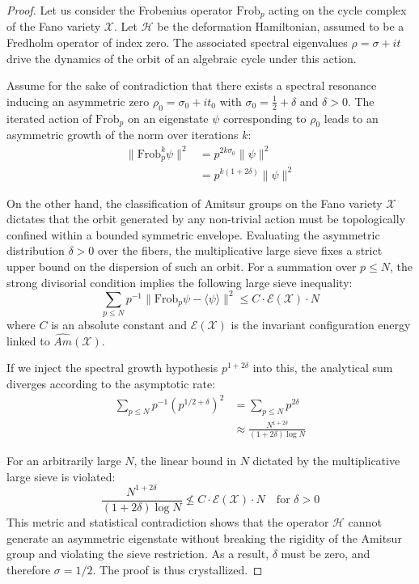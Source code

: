 \documentclass[
]{article}
\begin{document}
\begin{proof}
Let us consider the Frobenius operator $\mathrm{Frob}_p$ acting on the cycle complex of the Fano variety $\mathcal{X}$. Let $\mathcal{H}$ be the deformation Hamiltonian, assumed to be a Fredholm operator of index zero. The associated spectral eigenvalues $\rho = \sigma + it$ drive the dynamics of the orbit of an algebraic cycle under this action.

Assume for the sake of contradiction that there exists a spectral resonance inducing an asymmetric zero $\rho_0 = \sigma_0 + it_0$ with $\sigma_0 = \frac{1}{2} + \delta$ and $\delta > 0$.
The iterated action of $\mathrm{Frob}_p$ on an eigenstate $\psi$ corresponding to $\rho_0$ leads to an asymmetric growth of the norm over iterations $k$:
\begin{align*}
\|\mathrm{Frob}_p^k \psi\|^2 &= p^{2k\sigma_0} \|\psi\|^2 \\
&= p^{k(1 + 2\delta)} \|\psi\|^2
\end{align*}

On the other hand, the classification of Amitsur groups on the Fano variety $\mathcal{X}$ dictates that the orbit generated by any non-trivial action must be topologically confined within a bounded symmetric envelope. Evaluating the asymmetric distribution $\delta > 0$ over the fibers, the multiplicative large sieve fixes a strict upper bound on the dispersion of such an orbit. For a summation over $p \le N$, the strong divisorial condition implies the following large sieve inequality:
\begin{equation*}
\sum_{p \le N} p^{-1} \|\mathrm{Frob}_p \psi - \langle \psi \rangle\|^2 \le C \cdot \mathcal{E}(\mathcal{X}) \cdot N
\end{equation*}
where $C$ is an absolute constant and $\mathcal{E}(\mathcal{X})$ is the invariant configuration energy linked to $\widehat{Am}(\mathcal{X})$.

If we inject the spectral growth hypothesis $p^{1+2\delta}$ into this, the analytical sum diverges according to the asymptotic rate:
\begin{align*}
\sum_{p \le N} p^{-1} (p^{1/2 + \delta})^2 &= \sum_{p \le N} p^{2\delta} \\
&\approx \frac{N^{1+2\delta}}{(1+2\delta)\log N}
\end{align*}

For an arbitrarily large $N$, the linear bound in $N$ dictated by the multiplicative large sieve is violated:
\begin{equation*}
\frac{N^{1+2\delta}}{(1+2\delta)\log N} \not\le C \cdot \mathcal{E}(\mathcal{X}) \cdot N \quad \text{for } \delta > 0
\end{equation*}
This metric and statistical contradiction shows that the operator $\mathcal{H}$ cannot generate an asymmetric eigenstate without breaking the rigidity of the Amitsur group and violating the sieve restriction. As a result, $\delta$ must be zero, and therefore $\sigma = 1/2$. The proof is thus crystallized.
\end{proof}
\end{document}
